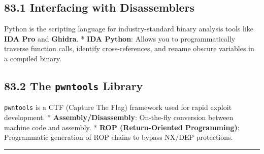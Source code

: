 \hypertarget{interfacing-with-disassemblers}{%
\subsection{83.1 Interfacing with
Disassemblers}\label{interfacing-with-disassemblers}}

Python is the scripting language for industry-standard binary analysis
tools like \textbf{IDA Pro} and \textbf{Ghidra}. * \textbf{IDA Python}:
Allows you to programmatically traverse function calls, identify
cross-references, and rename obscure variables in a compiled binary.

\hypertarget{the-pwntools-library}{%
\subsection{\texorpdfstring{83.2 The \texttt{pwntools}
Library}{83.2 The pwntools Library}}\label{the-pwntools-library}}

\passthrough{\lstinline!pwntools!} is a CTF (Capture The Flag) framework
used for rapid exploit development. * \textbf{Assembly/Disassembly}:
On-the-fly conversion between machine code and assembly. * \textbf{ROP
(Return-Oriented Programming)}: Programmatic generation of ROP chains to
bypass NX/DEP protections.

\begin{center}\rule{0.5\linewidth}{0.5pt}\end{center}
